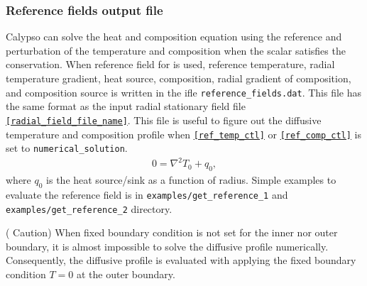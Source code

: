\subsubsection{Reference fields output file}\label{sec:ref_field_output}
Calypso can solve the heat and composition equation using the reference and perturbation of the temperature and composition when the scalar satisfies the conservation.
When reference field for is used, reference temperature, radial temperature gradient, heat source, composition, radial gradient of composition, and composition source is written in the ifle {\tt reference\_fields.dat}. This file has the same format as the input radial stationary field file  \hyperref[href_t:radial_field_file_name]{\tt [radial\_field\_file\_name]}. This file is useful to figure out the diffusive temperature and composition profile when \hyperref[href_t:ref_temp_ctl]{\tt [ref\_temp\_ctl]} or \hyperref[href_t:ref_comp_ctl]{\tt [ref\_comp\_ctl]} is set to {\tt numerical\_solution}. 
%
\begin{eqnarray}
 0 = \nabla^{2} T_{0} + q_{0},
\nonumber
\end{eqnarray}
%
where $q_{0}$ is the heat source/sink as a function of radius. Simple examples to evaluate the reference field is in {\tt examples/get\_reference\_1} and {\tt examples/get\_reference\_2} directory.

({\color{red} Caution}) When fixed boundary condition is not set for the inner nor outer boundary, it is almost impossible to solve the diffusive profile numerically. Consequently, the diffusive profile is evaluated with applying the fixed boundary condition $T = 0$ at the outer boundary. 
%
%
